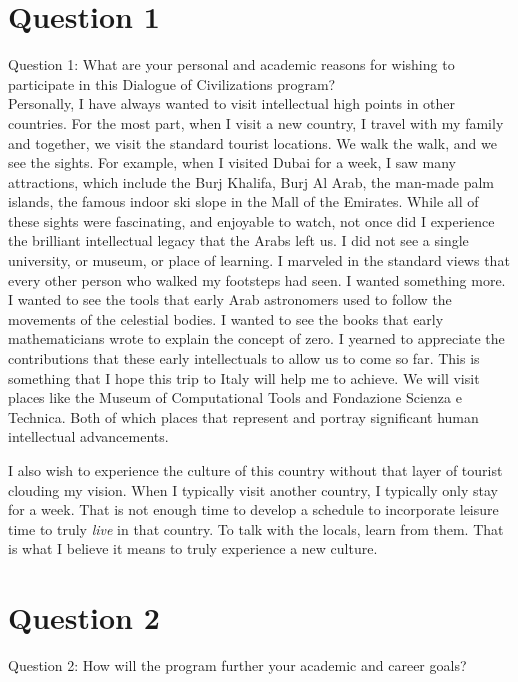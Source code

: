 \documentclass{article}
\begin{document}
\section{Question 1}
Question 1: What are your personal and academic reasons for wishing to
participate in this Dialogue of Civilizations program?\\

Personally, I have always wanted to visit intellectual high points in other
countries. For the most part, when I visit a new country, I travel with my
family and together, we visit the standard tourist locations. We walk the walk,
and we see the sights. For example, when I visited Dubai for a week, I saw many
attractions, which include the Burj Khalifa, Burj Al Arab, the man-made palm
islands, the famous indoor ski slope in the Mall of the Emirates. While all of
these sights were fascinating, and enjoyable to watch, not once did I experience
the brilliant intellectual legacy that the Arabs left us. I did not see a single
university, or museum, or place of learning. I marveled in the standard views
that every other person who walked my footsteps had seen. I wanted something
more. I wanted to see the tools that early Arab astronomers used to follow the
movements of the celestial bodies. I wanted to see the books that early
mathematicians wrote to explain the concept of zero. I yearned to appreciate the
contributions that these early intellectuals to allow us to come so far. This is
something that I hope this trip to Italy will help me to achieve. We will visit
places like the Museum of Computational Tools and Fondazione Scienza e Technica.
Both of which places that represent and portray significant human intellectual
advancements.

I also wish to experience the culture of this country without that layer of
tourist clouding my vision. When I typically visit another country, I typically
only stay for a week. That is not enough time to develop a schedule to
incorporate leisure time to truly \textit{live} in that country. To talk with
the locals, learn from them. That is what I believe it means to truly experience
a new culture.

\section{Question 2}
Question 2: How will the program further your academic and career goals?
\end{document}
